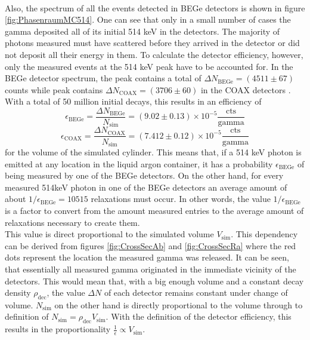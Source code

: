 \documentclass[encoding=utf8,british]{tumphthesis}
\begin{document}
\\
Also,  the spectrum of all the events detected in BEGe detectors is shown in figure \ref{fig:PhasenraumMC514}.
One can see that only in a small number of cases the gamma deposited all of its initial 514 keV in the detectors.
The majority of photons measured must have scattered before they arrived in the detector or did not deposit all their energy in them.
To calculate the detector efficiency, however, only the measured events at the 514 keV peak have to be accounted for.
In the BEGe detector spectrum, the peak contains a total of \(\Delta N_{\mathrm{BEGe}} = (4511\pm67)\) counts while peak contains \(\Delta N_{\mathrm{COAX}} = (3706\pm60)\) in the COAX detectors .
With a total of 50 million initial decays, this results in an efficiency of 
\begin{equation*}
\epsilon_{\mathrm{BEGe}} = \frac{\Delta N_{\mathrm{BEGe}}}{N_{\mathrm{sim}}} = (9.02\pm0.13) \times 10^{-5}  \frac{\mathrm{cts}}{\mathrm{gamma}}
\end{equation*}
\begin{equation*}
\epsilon_{\mathrm{COAX}} = \frac{\Delta N_{\mathrm{COAX}}}{N_{\mathrm{sim}}} = (7.412\pm0.12) \times 10^{-5}  \frac{\mathrm{cts}}{\mathrm{gamma}}
\end{equation*}
for the volume of the simulated cylinder.
This means that, if a 514 keV photon is emitted at any location in the liquid argon container, it has a probability \(\epsilon_{\mathrm{BEGe}}\) of being measured by one of the BEGe detectors.
On the other hand, for every measured 514keV photon in one of the BEGe detectors an average amount of about $1 / \epsilon_{\mathrm{BEGe}} = 10515$  relaxations must occur.
In other words, the value $1 / \epsilon_{\mathrm{BEGe}}$ is a factor to convert from the amount measured entries to the average amount of  relaxations necessary to create them.
\\

This value is direct proportional to the simulated volume $V_{\mathrm{sim}}$.
This dependency can be derived from figures \ref{fig:CrossSecAb} and \ref{fig:CrossSecRa} where the red dots represent the location the measured gamma was released.
It can be seen, that essentially all measured gamma originated in the immediate vicinity of the detectors.
This would mean that, with a big enough volume and a constant decay density $\rho_{\mathrm{dec}}$, the value $\Delta N$ of each detector remains constant under change of volume.
$N_{\mathrm{sim}}$ on the other hand is directly proportional to the volume through to definition of $N_{\mathrm{sim}} = \rho_{\mathrm{dec}} V_{\mathrm{sim}}$.
With the definition of the detector efficiency, this results in the proportionality  $\frac{1}{\epsilon} \propto V_{\mathrm{sim}}$.
\\
\end{document}
